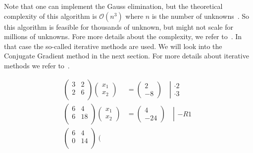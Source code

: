 \documentclass[11pt,fleqn]{book} %
\begin{document}
Note that one can implement the Gauss elimination, but the theoretical complexity of this algorithm is $\mathcal{O}(n^3)$ where $n$ is the number of unknowns~\cite{farebrother1988linear}. So this algorithm is feasible for thousands of unknown, but might not scale for millions of unknowns. Fore more details about the complexity, we refer to~\cite{fang1997worst}. In that case the so-called iterative methods are used. We will look into the Conjugate Gradient method in the next section. For more details about iterative methods we refer to~\cite{olshanskii2014iterative,briggs2000multigrid}.


\begin{align}
\left(\begin{matrix}
3 & 2 \\
2 & 6 \\
\end{matrix}\right)
\left(\begin{matrix}
x_1 \\
x_2
\end{matrix}\right)
&=\left(
\begin{matrix}
2 \\
-8
\end{matrix}\right)
\quad \left|\begin{matrix}
\cdot 2 \\
\cdot 3
\end{matrix}\right. \label{eq:gauss:1}\\
\left(\begin{matrix}
6 & 4 \\
6 & 18 \\
\end{matrix}\right)
\left(\begin{matrix}
x_1 \\
x_2
\end{matrix}\right)
&=\left(
\begin{matrix}
4 \\
-24
\end{matrix}\right)
\quad\left|\begin{matrix}
 \\
- R1 \\
\end{matrix}\right. \label{eq:gauss:2} \\
\left(\begin{matrix}
6 & 4 \\
0 & 14 \\
\end{matrix}\right)
\left(\begin{matrix}

\end{matrix}
\end{align}
\end{document}

